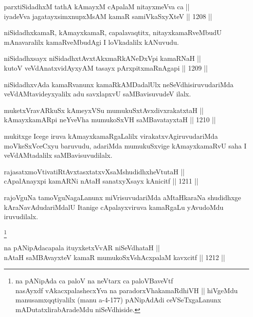 \begin{shl}
parxtiSidadhxM tathA kAmayxM cApalaM nitayxmeVva ca || \\
iyadeVva jagatayxsimxnupxMsAM kamaR samiVkaSxyXteV ||  1208 ||  
\end{shl}

\begin{artha}
niSidadhxkamaR, kAmayxkamaR, capalavaqtitx, nitayxkamaRveMbudU mAnavaralilx kamaRveMbudAgi I loVkadalilx kANuvudu.
\end{artha}

\begin{shl}
niSidadhxsayx niSidadhxtAvxtAkxmaRkANeDxV\s pi kamaRNaH || \\
kutoV veVdAnatxvidAyxyAM tasayx pArxpitxmaRnAgapi ||  1209 ||  
\end{shl}

\begin{artha}
niSidadhxvAda kamaRvanunx kamaRkAMDadalUlx neSeVdhisiruvudariMda veVdAMtavideyxyalilx adu savxlapxvU saMBavisuvudeV ilalx.
\end{artha}

\begin{shl}
muketxVravARkuSx kAmeyxVSu mumukuSxtAvxdivxrakatxtaH || \\
kAmayxkamARpi neYveVha mumukoSxVH saMBavatayxtaH ||  1210 ||  
\end{shl}

\begin{artha}
mukitxge Icege iruva kAmayxkamaRgaLalilx virakatxvAgiruvudariMda moVkeSxVceCxyu baruvudu, adariMda mumukuSxvige kAmayxkamaRvU saha I veVdAMtadalilx saMBavisuvudilalx.
\end{artha}

\begin{shl}
rajasatxmoVtivatiRtAvxtasxtatxvXsaMshudidhxheVtutaH || \\
cApalAnayxpi kamARNi nAtaH sanatxyXsayx kAnicitf ||  1211 ||  
\end{shl}

\begin{artha}
rajoVguNa tamoVguNagaLanunx miVrisuvudariMda aMtaHkaraNa shudidhxge kAraNavAdudariMdalU Itanige cApalayxviruva kamaRgaLu yAvudoMdu iruvudilalx.
\end{artha}

\footnote{na pANipAda ca paloV na neVtarx ca paloVBaveVtf\\
nasAyxdf vAkacxpalashecxYva na paradorxVhakamaRdhiVH || hiVgeMdu manusamxqqtiyalilx (manu a-4-177) pANipAdAdi ceVSeTxgaLanunx mADutatxlirabAradeMdu niSeVdhiside.}
\begin{shl}
na pANipAdacapala ituyxketxVvAR niSeVdhataH || \\
nAtaH saMBAvayxteV kamaR mumukoSxVshAcxpalaM kavxcitf ||  1212 ||  
\end{shl}

